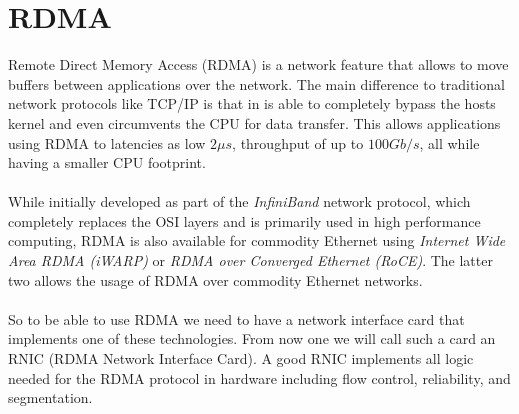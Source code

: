 \section{RDMA} \label{sec:rdma}

Remote Direct Memory Access (RDMA) is a network feature that allows to move buffers between applications over the network.
The main difference to traditional network protocols like TCP/IP is that in is able to completely bypass the hosts kernel
and even circumvents the CPU for data transfer. This allows applications using RDMA to latencies as low $2 \mu s$, 
throughput of up to $100 Gb/s$, all while having a smaller CPU footprint.


\paragraph{} While initially developed as part of the \emph{InfiniBand} network protocol, which completely replaces the OSI 
layers and is primarily used in high performance computing, RDMA is also available for commodity Ethernet using 
\emph{Internet Wide Area RDMA (iWARP)} or \emph{RDMA over Converged Ethernet (RoCE)}. The latter two allows the usage of 
RDMA over commodity Ethernet networks. 


\paragraph{} So to be able to use RDMA we need to have a network interface card that implements one of these technologies. 
From now one we will call such a card an RNIC (RDMA Network Interface Card). A good RNIC implements all logic needed for 
the RDMA protocol in hardware including flow control, reliability, and segmentation.


